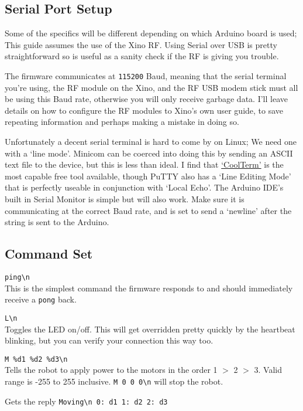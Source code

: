 \subsection{Serial Port Setup}

Some of the specifics will be different depending on which Arduino board is used; This guide assumes the use of the Xino RF. Using Serial over USB is pretty straightforward so is useful as a sanity check if the RF is giving you trouble.

The firmware communicates at \texttt{115200} Baud, meaning that the serial terminal you're using, the RF module on the Xino, and the RF USB modem stick must all be using this Baud rate, otherwise you will only receive garbage data. I'll leave details on how to configure the RF modules to Xino's own user guide, to save repeating information and perhaps making a mistake in doing so.

Unfortunately a decent serial terminal is hard to come by on Linux; We need one with a `line mode'. Minicom can be coerced into doing this by sending an ASCII text file to the device, but this is less than ideal. I find that \href{http://freeware.the-meiers.org/}{`CoolTerm'} is the most capable free tool available, though PuTTY also has a `Line Editing Mode' that is perfectly useable in conjunction with `Local Echo'. The Arduino IDE's built in Serial Monitor is simple but will also work. Make sure it is communicating at the correct Baud rate, and is set to send a `newline' after the string is sent to the Arduino.

\subsection{Command Set}

\verb|ping\n|\\
This is the simplest command the firmware responds to and should immediately receive a \verb|pong| back.

\verb|L\n|\\
Toggles the LED on/off. This will get overridden pretty quickly by the heartbeat blinking, but you can verify your connection this way too.

\verb|M %d1 %d2 %d3\n|\\
Tells the robot to apply power to the motors in the order 1 $>$ 2 $>$ 3. Valid range is -255 to 255 inclusive. \verb|M 0 0 0\n| will stop the robot.

Gets the reply \verb|Moving\n 0: d1 1: d2 2: d3|

